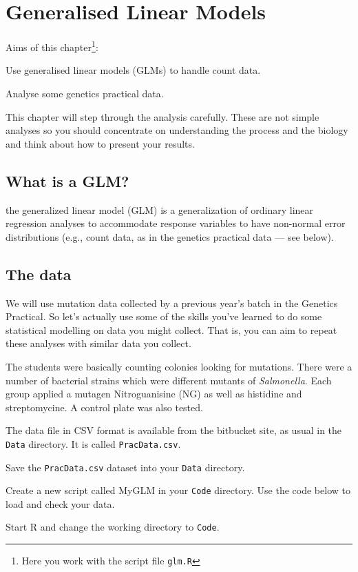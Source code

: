 \chapter{Generalised Linear Models}
\label{chap:GLM}

Aims of this chapter\footnote{Here you work with the script file {\tt glm.R}}:
\begin{compactitem}
	\item Use generalised linear models (GLMs) to handle count data.
	\item Analyse some genetics practical data.
	\item This chapter will step through the analysis carefully. These 
	are not simple analyses so you should concentrate on understanding 
	the process and the biology and think about how to present your 
	results.
	
\end{compactitem}

\section{What is a GLM?}

the generalized linear model (GLM) is a generalization of ordinary 
linear regression analyses to accommodate response variables to have 
non-normal error distributions (e.g., count data, as in the genetics 
practical data --- see below).

\section{The data}

We will use mutation data collected by a previous year's batch in the 
Genetics Practical. So let's actually use some of the skills you've 
learned to do some statistical modelling on data you might collect. 
That is, you  can aim to repeat these analyses with similar data you 
collect.

The students were basically counting colonies looking for mutations. 
There were a number of bacterial strains which were different mutants 
of {\it Salmonella}. Each group applied a mutagen Nitroguanisine (NG) 
as well as histidine and streptomycine. A control plate was also 
tested. 

The data file in CSV format is available from the bitbucket site, as 
usual in the {\tt Data} directory. It is called {\tt PracData.csv}.

\begin{compactitem}[$\quad\star$]
	\item Save the {\tt PracData.csv} dataset into your {\tt Data} 
	directory. 
	\item Create a new script called MyGLM in your {\tt Code} directory.  
	Use the code below to load and check your data.
	\item Start R and change the working directory to {\tt Code}.
\end{compactitem}

